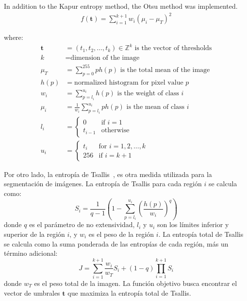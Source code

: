 \documentclass{elsarticle}
\begin{document}
\noindent In addition to the Kapur entropy method, the Otsu method was implemented.
\begin{equation}
\begin{gathered}
f(\mathbf{t})=\sum_{i=1}^{k+1} w_i (\mu_i - \mu_T)^2 
\end{gathered}
\end{equation}

where:
\begin{equation}
\begin{aligned}
\mathbf{t} &= (t_1, t_2, \dots, t_k) \in \mathbb{Z}^k \text{ is the vector of thresholds} \\
k &= \text{dimension of the image} \\
\mu_T &= \sum_{p=0}^{255} p h(p) \text{ is the total mean of the image} \\
h(p) &= \text{normalized histogram for pixel value } p \\
w_i &= \sum_{p=l_i}^{u_i} h(p) \text{ is the weight of class } i \\
\mu_i &= \frac{1}{w_i} \sum_{p=l_i}^{u_i} p h(p) \text{ is the mean of class } i \\
l_i &= \begin{cases}
0 & \text{if } i = 1 \\
t_{i-1} & \text{otherwise}
\end{cases} \\
u_i &= \begin{cases}
t_i & \text{for } i = 1, 2, \dots, k \\
256 & \text{if } i = k+1
\end{cases}
\end{aligned}
\end{equation}


\noindent Por otro lado, la entropía de Tsallis~\cite{KaushikPancholi2023}, es otra medida utilizada para la segmentación de imágenes. La entropía de Tsallis para cada región $i$ se calcula como:
\begin{equation}
S_i = \frac{1}{q-1}\left(1 - \sum_{p=l_i}^{u_i} \left(\frac{h(p)}{w_i}\right)^q\right)
\end{equation}
\noindent donde $q$ es el parámetro de no extensividad, $l_i$ y $u_i$ son los límites inferior y superior de la región $i$, y $w_i$ es el peso de la región $i$. La entropía total de Tsallis se calcula como la suma ponderada de las entropías de cada región, más un término adicional:
\begin{equation}
J = \sum_{i=1}^{k+1} \frac{w_i}{w_T} S_i + (1-q) \prod_{i=1}^{k+1} S_i
\end{equation}
\noindent donde $w_T$ es el peso total de la imagen. La función objetivo busca encontrar el vector de umbrales $\mathbf{t}$ que maximiza la entropía total de Tsallis.
\end{document}
